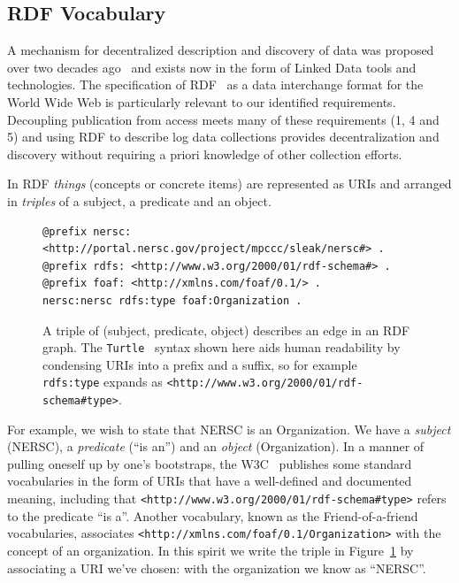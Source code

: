 \subsection{RDF Vocabulary}

A mechanism for decentralized description and discovery of data was proposed
over two decades ago~\cite{SemanticWebOrig}
and exists now in the form of Linked Data tools and technologies. The 
specification of RDF~\cite{RDF} as a data interchange format for the World Wide 
Web is particularly relevant 
to our identified requirements. Decoupling publication 
from access meets many of these requirements (1, 4 and 5) and 
using RDF to describe log data collections provides decentralization 
and discovery without requiring a priori knowledge of other collection 
efforts.

In RDF \emph{things} (concepts or concrete items) are represented as URIs
and arranged in \emph{triples} of a subject, a predicate and an object.  

\begin{figure}
\begin{verbatim}
@prefix nersc: <http://portal.nersc.gov/project/mpccc/sleak/nersc#> .
@prefix rdfs: <http://www.w3.org/2000/01/rdf-schema#> .
@prefix foaf: <http://xmlns.com/foaf/0.1/> .
nersc:nersc rdfs:type foaf:Organization .
\end{verbatim}

\caption{A triple of (subject, predicate, object) describes an edge 
in an RDF graph. The \texttt{Turtle}~\cite{TurtleSpec} syntax shown
here aids human readability by condensing URIs into a prefix and a suffix,
so for example \texttt{rdfs:type} expands as
\texttt{<http://www.w3.org/2000/01/rdf-schema\#type>}.}
\label{f:rdftriples}
\end{figure}

For example, we wish to state that NERSC is an Organization. We have a 
\emph{subject} (NERSC), a \emph{predicate} (``is an'') and an \emph{object} 
(Organization). In a manner of pulling oneself up by one's bootstraps, the 
W3C~\cite{W3Cweb} publishes some standard 
vocabularies in the form of URIs that have a well-defined and documented 
meaning, including that \texttt{<http://www.w3.org/2000/01/rdf-schema\#type>}
refers to the predicate ``is a''. Another vocabulary, known as the 
Friend-of-a-friend vocabularies, associates \texttt{<http://xmlns.com/foaf/0.1/Organization>} with the concept of an 
organization. In this spirit we write the triple in Figure~\ref{f:rdftriples}
by associating a URI we've chosen:  with the organization we know as ``NERSC''. 

